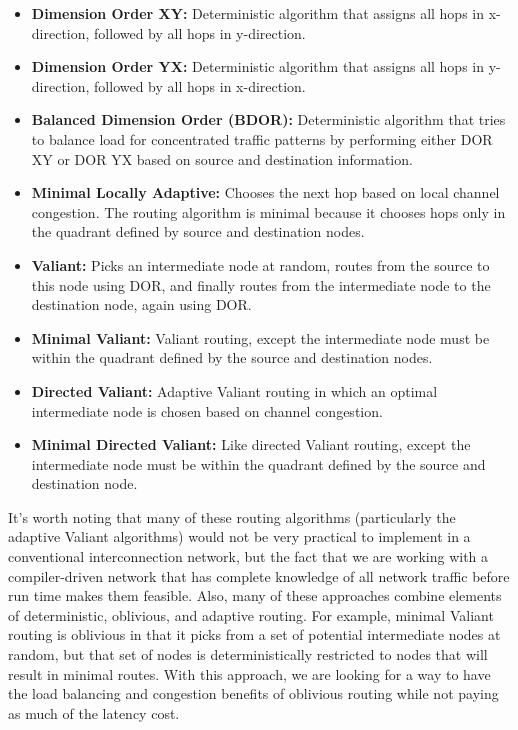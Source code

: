 \begin{itemize}
  \item \textbf{Dimension Order XY:} Deterministic algorithm that assigns all hops in x-direction, followed by all hops in y-direction.
   \item \textbf{Dimension Order YX:} Deterministic algorithm that assigns all hops in y-direction, followed by all hops in x-direction.
  \item \textbf{Balanced Dimension Order (BDOR):} Deterministic algorithm that tries to balance load for concentrated traffic patterns by performing either DOR XY or DOR YX based on source and destination information.
  \item \textbf{Minimal Locally Adaptive:} Chooses the next hop based on local channel congestion. The routing algorithm is minimal because it chooses hops only in the quadrant defined by source and destination nodes.
  \item \textbf{Valiant:} Picks an intermediate node at random, routes from the source to this node using DOR, and finally routes from the intermediate node to the destination node, again using DOR.
  \item \textbf{Minimal Valiant:} Valiant routing, except the intermediate node must be within the quadrant defined by the source and destination nodes.
  \item \textbf{Directed Valiant:} Adaptive Valiant routing in which an optimal intermediate node is chosen based on channel congestion.
  \item \textbf{Minimal Directed Valiant:} Like directed Valiant routing, except the intermediate node must be within the quadrant defined by the source and destination node.   
\end{itemize}
It's worth noting that many of these routing algorithms (particularly the adaptive Valiant algorithms) would not be very practical to implement in a conventional interconnection network, but the fact that we are working with a compiler-driven network that has complete knowledge of all network traffic before run time makes them feasible. Also, many of these approaches combine elements of deterministic, oblivious, and adaptive routing. For example, minimal Valiant routing is oblivious in that it picks from a set of potential intermediate nodes at random, but that set of nodes is deterministically restricted to nodes that will result in minimal routes. With this approach, we are looking for a way to have the load balancing and congestion benefits of oblivious routing while not paying as much of the latency cost.

